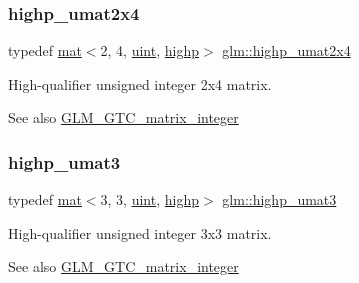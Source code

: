 \subsubsection{\texorpdfstring{highp\+\_\+umat2x4}{highp\_umat2x4}}
{\footnotesize\ttfamily typedef \hyperlink{structglm_1_1mat}{mat}$<$2, 4, \hyperlink{group__core__precision_ga4fd29415871152bfb5abd588334147c8}{uint}, \hyperlink{namespaceglm_a36ed105b07c7746804d7fdc7cc90ff25ac6f7eab42eacbb10d59a58e95e362074}{highp}$>$ \hyperlink{group__gtc__matrix__integer_ga451e726ea1f020c97b2f8aa41242055b}{glm\+::highp\+\_\+umat2x4}}

High-\/qualifier unsigned integer 2x4 matrix. \begin{DoxySeeAlso}{See also}
\hyperlink{group__gtc__matrix__integer}{G\+L\+M\+\_\+\+G\+T\+C\+\_\+matrix\+\_\+integer} 
\end{DoxySeeAlso}
\mbox{\label{group__gtc__matrix__integer_ga2718f6f3a37cd13e75e6839a8a5f2355}} 
\subsubsection{\texorpdfstring{highp\+\_\+umat3}{highp\_umat3}}
{\footnotesize\ttfamily typedef \hyperlink{structglm_1_1mat}{mat}$<$3, 3, \hyperlink{group__core__precision_ga4fd29415871152bfb5abd588334147c8}{uint}, \hyperlink{namespaceglm_a36ed105b07c7746804d7fdc7cc90ff25ac6f7eab42eacbb10d59a58e95e362074}{highp}$>$ \hyperlink{group__gtc__matrix__integer_ga2718f6f3a37cd13e75e6839a8a5f2355}{glm\+::highp\+\_\+umat3}}

High-\/qualifier unsigned integer 3x3 matrix. \begin{DoxySeeAlso}{See also}
\hyperlink{group__gtc__matrix__integer}{G\+L\+M\+\_\+\+G\+T\+C\+\_\+matrix\+\_\+integer} 
\end{DoxySeeAlso}
\mbox{\label{group__gtc__matrix__integer_ga91ed05f00d470b2448e024af7e244f49}} 
